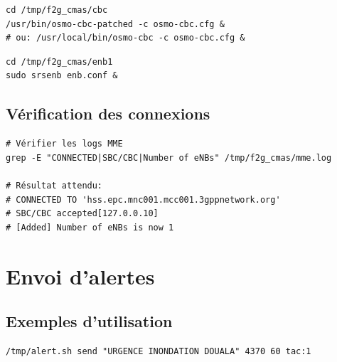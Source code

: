 \documentclass[11pt,a4paper]{article}
\begin{document}
\begin{cmdbox}
\begin{lstlisting}[style=bashstyle]
cd /tmp/f2g_cmas/cbc
/usr/bin/osmo-cbc-patched -c osmo-cbc.cfg &
# ou: /usr/local/bin/osmo-cbc -c osmo-cbc.cfg &
\end{lstlisting}
\end{cmdbox}

\begin{cmdbox}
\begin{lstlisting}[style=bashstyle]
cd /tmp/f2g_cmas/enb1
sudo srsenb enb.conf &
\end{lstlisting}
\end{cmdbox}

\subsection{Vérification des connexions}

\begin{successbox}
\begin{lstlisting}[style=bashstyle]
# Vérifier les logs MME
grep -E "CONNECTED|SBC/CBC|Number of eNBs" /tmp/f2g_cmas/mme.log

# Résultat attendu:
# CONNECTED TO 'hss.epc.mnc001.mcc001.3gppnetwork.org'
# SBC/CBC accepted[127.0.0.10]
# [Added] Number of eNBs is now 1
\end{lstlisting}
\end{successbox}

\newpage

\section{Envoi d'alertes}

\subsection{Exemples d'utilisation}

\begin{cmdbox}
\begin{lstlisting}[style=bashstyle]
/tmp/alert.sh send "URGENCE INONDATION DOUALA" 4370 60 tac:1
\end{lstlisting}
\end{cmdbox}
\end{document}
